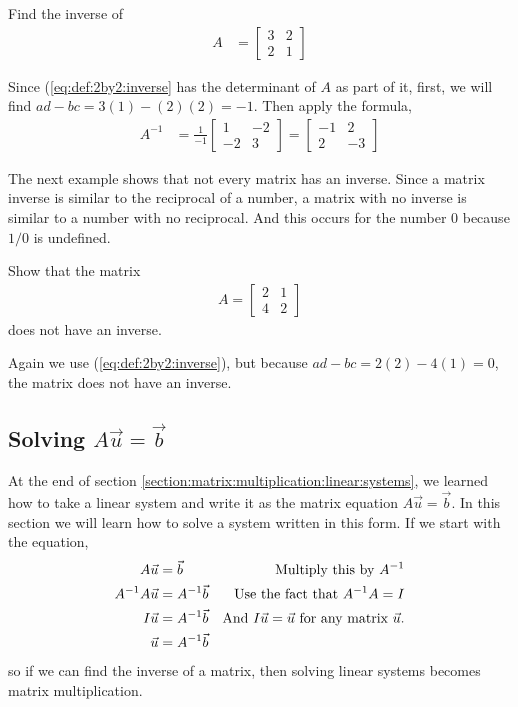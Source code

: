 \begin{example}
Find the inverse of
%
\begin{align*}
A & = \begin{bmatrix}
3 & 2 \\ 2 & 1
\end{bmatrix}
\end{align*}
%
\solution

Since (\ref{eq:def:2by2:inverse} has the determinant of $A$ as part of it, first, we will find $ad-bc = 3(1)-(2)(2) = -1$.  Then apply the formula,
%
\begin{align*}
A^{-1} & = \frac{1}{-1} \begin{bmatrix}
1 & -2 \\ -2 & 3
\end{bmatrix} = \begin{bmatrix}
-1 & 2 \\ 2 & -3
\end{bmatrix}
\end{align*}
\end{example}
The next example shows that not every matrix has an inverse.  Since a matrix inverse is similar to the reciprocal of a number, a matrix with no inverse is similar to a number with no reciprocal.  And this occurs for the number 0 because $1/0$ is undefined.

\begin{example} \label{ex:2by2:noinverse}
Show that the matrix
%
\begin{align*}
A = \begin{bmatrix}
2 & 1 \\ 4 & 2
\end{bmatrix}
\end{align*}
does not have an inverse.

\solution

Again we use (\ref{eq:def:2by2:inverse}), but because $ad-bc = 2(2)-4(1) = 0$,  the matrix does not have an inverse.
\end{example}

\subsection{Solving $A\vec{u}=\vec{b}$}

At the end of section \ref{section:matrix:multiplication:linear:systems}, we learned how to take a linear system and write it as the matrix equation $A\vec{u}=\vec{b}$.  In this section we will learn how to solve a system written in this form. If we start with the equation,
%
\begin{align*}
A\vec{u} & =\vec{b}  & \text{Multiply this by $A^{-1}$} \\
A^{-1} A \vec{u}& = A^{-1} \vec{b} & \text{Use the fact that $A^{-1}A=I$} \\
I \vec{u} &  = A^{-1} \vec{b} & \text{And $I\vec{u}=\vec{u}$ for any matrix $ \vec{u}$.} \\
\vec{u} &= A^{-1}\vec{b}
\end{align*}
%
so if we can find the inverse of a matrix, then solving linear systems becomes matrix multiplication.

